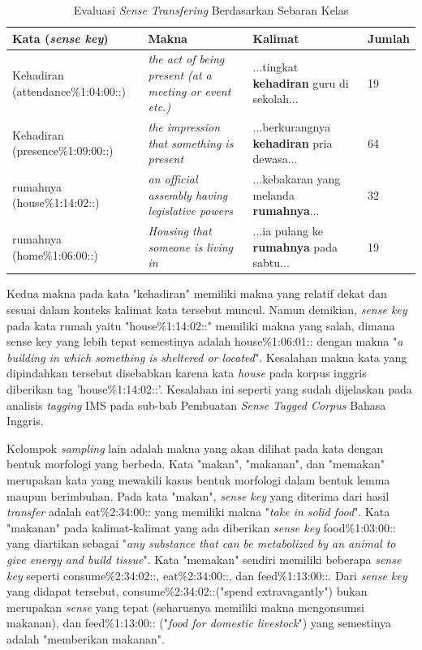\begin{table}
	\centering
	\caption{Evaluasi \textit{Sense Transfering} Berdasarkan Sebaran Kelas}
	\label{table:class-instance-sense-transfering-evaluation}
	\begin{tabular}{|p{4cm}|p{2.85cm}|p{2.85cm}|p{1.2cm}|}
		\hline
		\textbf{Kata (\textit{sense key})} & \textbf{Makna} & \textbf{Kalimat} & \textbf{Jumlah}
		\\ \hline
		Kehadiran (attendance\%1:04:00::)  & 
		\textit{the act of being present (at a meeting or event etc.)}   & 
		...tingkat \textbf{kehadiran} guru di sekolah... &
		19
		\\ \hline
		Kehadiran (presence\%1:09:00::) & 
		\textit{the impression that something is present}   & 
		...berkurangnya \textbf{kehadiran} pria dewasa...
		&
		64
		\\ \hline
		rumahnya (house\%1:14:02::) & 
		\textit{an official assembly having legislative powers} & 
		...kebakaran yang melanda \textbf{rumahnya}...
		& 32
		\\ \hline
		rumahnya (home\%1:06:00::) &
		\textit{Housing that someone is living in} &
		...ia pulang ke \textbf{rumahnya} pada sabtu...
		& 19
		\\ \hline
	\end{tabular}
\end{table}

Kedua makna pada kata "kehadiran" memiliki makna yang relatif dekat dan sesuai dalam konteks kalimat kata tersebut muncul. Namun demikian, \textit{sense key} pada kata rumah yaitu "house\%1:14:02::" memiliki makna yang salah, dimana sense key yang lebih tepat semestinya adalah house\%1:06:01:: dengan makna "\textit{a building in which something is sheltered or located}". Kesalahan makna kata yang dipindahkan tersebut disebabkan karena kata \textit{house} pada korpus inggris diberikan tag 'house\%1:14:02::'. Kesalahan ini seperti yang sudah dijelaskan pada analisis \textit{tagging} IMS pada sub-bab Pembuatan \textit{Sense Tagged Corpus} Bahasa Inggris.


Kelompok \textit{sampling} lain adalah makna yang akan dilihat pada kata dengan bentuk morfologi yang berbeda. Kata "makan", "makanan", dan "memakan" merupakan kata yang mewakili kasus bentuk morfologi dalam bentuk lemma maupun berimbuhan. Pada kata "makan", \textit{sense key} yang diterima dari hasil \textit{transfer} adalah eat\%2:34:00:: yang memiliki makna "\textit{take in solid food}". Kata "makanan" pada kalimat-kalimat yang ada diberikan \textit{sense key} food\%1:03:00:: yang diartikan sebagai "\textit{any substance that can be metabolized by an animal to give energy and build tissue}". Kata "memakan" sendiri memiliki beberapa \textit{sense key} seperti consume\%2:34:02::, eat\%2:34:00::, dan feed\%1:13:00::. Dari \textit{sense key} yang didapat tersebut, consume\%2:34:02::("spend extravagantly") bukan merupakan \textit{sense} yang tepat (seharusnya memiliki makna mengonsumsi makanan), dan feed\%1:13:00:: ("\textit{food for domestic livestock}") yang semestinya adalah "memberikan makanan".

